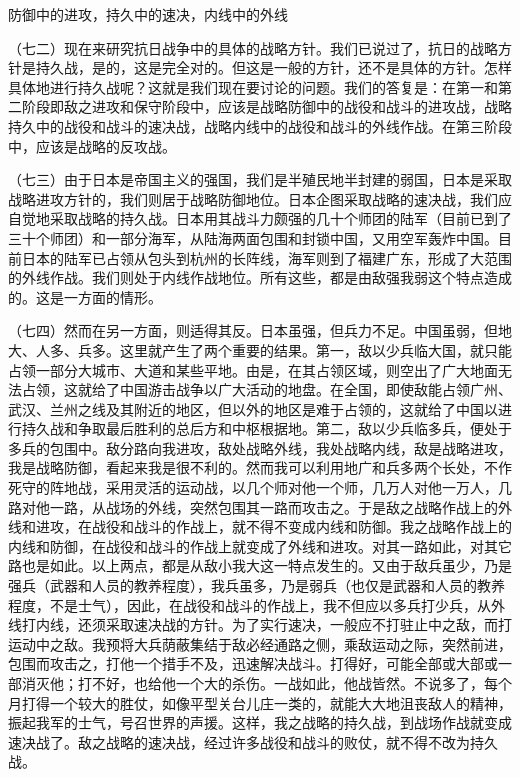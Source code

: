\documentclass[UTF8, 12pt, a4paper]{ctexrep}
\begin{document}
防御中的进攻，持久中的速决，内线中的外线

（七二）现在来研究抗日战争中的具体的战略方针。我们已说过了，抗日的战略方针是持久战，是的，这是完全对的。但这是一般的方针，还不是具体的方针。怎样具体地进行持久战呢？这就是我们现在要讨论的问题。我们的答复是：在第一和第二阶段即敌之进攻和保守阶段中，应该是战略防御中的战役和战斗的进攻战，战略持久中的战役和战斗的速决战，战略内线中的战役和战斗的外线作战。在第三阶段中，应该是战略的反攻战。

（七三）由于日本是帝国主义的强国，我们是半殖民地半封建的弱国，日本是采取战略进攻方针的，我们则居于战略防御地位。日本企图采取战略的速决战，我们应自觉地采取战略的持久战。日本用其战斗力颇强的几十个师团的陆军（目前已到了三十个师团）和一部分海军，从陆海两面包围和封锁中国，又用空军轰炸中国。目前日本的陆军已占领从包头到杭州的长阵线，海军则到了福建广东，形成了大范围的外线作战。我们则处于内线作战地位。所有这些，都是由敌强我弱这个特点造成的。这是一方面的情形。

（七四）然而在另一方面，则适得其反。日本虽强，但兵力不足。中国虽弱，但地大、人多、兵多。这里就产生了两个重要的结果。第一，敌以少兵临大国，就只能占领一部分大城市、大道和某些平地。由是，在其占领区域，则空出了广大地面无法占领，这就给了中国游击战争以广大活动的地盘。在全国，即使敌能占领广州、武汉、兰州之线及其附近的地区，但以外的地区是难于占领的，这就给了中国以进行持久战和争取最后胜利的总后方和中枢根据地。第二，敌以少兵临多兵，便处于多兵的包围中。敌分路向我进攻，敌处战略外线，我处战略内线，敌是战略进攻，我是战略防御，看起来我是很不利的。然而我可以利用地广和兵多两个长处，不作死守的阵地战，采用灵活的运动战，以几个师对他一个师，几万人对他一万人，几路对他一路，从战场的外线，突然包围其一路而攻击之。于是敌之战略作战上的外线和进攻，在战役和战斗的作战上，就不得不变成内线和防御。我之战略作战上的内线和防御，在战役和战斗的作战上就变成了外线和进攻。对其一路如此，对其它路也是如此。以上两点，都是从敌小我大这一特点发生的。又由于敌兵虽少，乃是强兵（武器和人员的教养程度），我兵虽多，乃是弱兵（也仅是武器和人员的教养程度，不是士气），因此，在战役和战斗的作战上，我不但应以多兵打少兵，从外线打内线，还须采取速决战的方针。为了实行速决，一般应不打驻止中之敌，而打运动中之敌。我预将大兵荫蔽集结于敌必经通路之侧，乘敌运动之际，突然前进，包围而攻击之，打他一个措手不及，迅速解决战斗。打得好，可能全部或大部或一部消灭他；打不好，也给他一个大的杀伤。一战如此，他战皆然。不说多了，每个月打得一个较大的胜仗，如像平型关台儿庄一类的，就能大大地沮丧敌人的精神，振起我军的士气，号召世界的声援。这样，我之战略的持久战，到战场作战就变成速决战了。敌之战略的速决战，经过许多战役和战斗的败仗，就不得不改为持久战。
\end{document}
